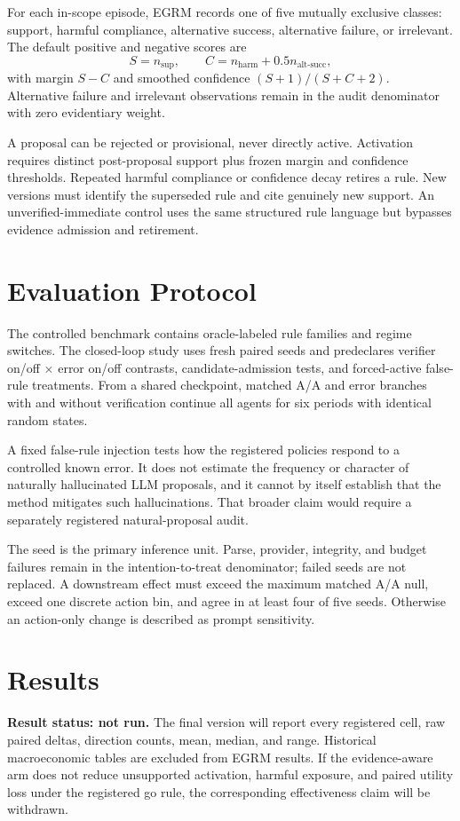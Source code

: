 \documentclass[sigconf,anonymous,review]{acmart}
\begin{document}
For each in-scope episode, EGRM records one of five mutually exclusive classes:
support, harmful compliance, alternative success, alternative failure, or
irrelevant. The default positive and negative scores are
\begin{equation}
 S= n_{\mathrm{sup}},\qquad
 C=n_{\mathrm{harm}}+0.5n_{\mathrm{alt\mbox{-}succ}},
\end{equation}
with margin $S-C$ and smoothed confidence
$(S+1)/(S+C+2)$. Alternative failure and irrelevant observations remain in the
audit denominator with zero evidentiary weight.

A proposal can be rejected or provisional, never directly active. Activation
requires distinct post-proposal support plus frozen margin and confidence
thresholds. Repeated harmful compliance or confidence decay retires a rule.
New versions must identify the superseded rule and cite genuinely new support.
An unverified-immediate control uses the same structured rule language but
bypasses evidence admission and retirement.

\section{Evaluation Protocol}
The controlled benchmark contains oracle-labeled rule families and regime
switches. The closed-loop study uses fresh paired seeds and predeclares verifier
on/off $\times$ error on/off contrasts, candidate-admission tests, and
forced-active false-rule treatments. From a shared checkpoint, matched A/A and
error branches with and without verification continue all agents for six
periods with identical random states.

A fixed false-rule injection tests how the registered policies respond to a
controlled known error. It does not estimate the frequency or character of
naturally hallucinated LLM proposals, and it cannot by itself establish that the
method mitigates such hallucinations. That broader claim would require a
separately registered natural-proposal audit.

The seed is the primary inference unit. Parse, provider, integrity, and budget
failures remain in the intention-to-treat denominator; failed seeds are not
replaced. A downstream effect must exceed the maximum matched A/A null, exceed
one discrete action bin, and agree in at least four of five seeds. Otherwise an
action-only change is described as prompt sensitivity.

\section{Results}
\textbf{Result status: not run.} The final version will report every registered
cell, raw paired deltas, direction counts, mean, median, and range. Historical
macroeconomic tables are excluded from EGRM results. If the evidence-aware arm
does not reduce unsupported activation, harmful exposure, and paired utility
loss under the registered go rule, the corresponding effectiveness claim will
be withdrawn.
\end{document}

